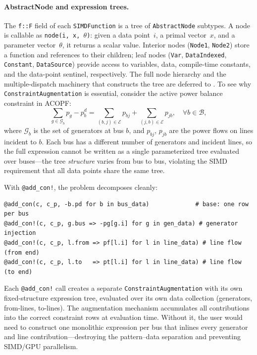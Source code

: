 \documentclass[11pt]{article}
\begin{document}
\paragraph{AbstractNode and expression trees.}
The \texttt{f::F} field of each \texttt{SIMDFunction} is a tree of \texttt{AbstractNode} subtypes. A node is callable as \texttt{node(i, x, $\theta$)}: given a data point~$i$, a primal vector~$x$, and a parameter vector~$\theta$, it returns a scalar value. Interior nodes (\texttt{Node1}, \texttt{Node2}) store a function and references to their children; leaf nodes (\texttt{Var}, \texttt{DataIndexed}, \texttt{Constant}, \texttt{DataSource}) provide access to variables, data, compile-time constants, and the data-point sentinel, respectively. The full node hierarchy and the multiple-dispatch machinery that constructs the tree are deferred to . To see why \texttt{ConstraintAugmentation} is essential, consider the active power balance constraint in ACOPF:
\begin{equation*}
  \sum_{g \in \mathcal{G}_b} p_g - p^d_b = \sum_{(b,j) \in \mathcal{E}} p_{bj}  + \sum_{(j,b) \in \mathcal{E}} p_{jb}, \quad \forall b \in \mathcal{B},
\end{equation*}
where $\mathcal{G}_b$ is the set of generators at bus $b$, and $p_{bj}$, $p_{jb}$ are the power flows on lines incident to $b$. Each bus has a different number of generators and incident lines, so the full expression cannot be written as a single parameterized tree evaluated over buses---the tree \emph{structure} varies from bus to bus, violating the SIMD requirement that all data points share the same tree.

With \texttt{@add\_con!}, the problem decomposes cleanly:
\begin{lstlisting}
@add_con(c, c_p, -b.pd for b in bus_data)             # base: one row per bus
@add_con!(c, c_p, g.bus => -pg[g.i] for g in gen_data) # generator injection
@add_con!(c, c_p, l.from => pf[l.i] for l in line_data) # line flow (from end)
@add_con!(c, c_p, l.to   => pt[l.i] for l in line_data) # line flow (to end)
\end{lstlisting}
Each \texttt{@add\_con!} call creates a separate \texttt{ConstraintAugmentation} with its own fixed-structure expression tree, evaluated over its own data collection (generators, from-lines, to-lines). The augmentation mechanism accumulates all contributions into the correct constraint rows at evaluation time. Without it, the user would need to construct one monolithic expression per bus that inlines every generator and line contribution---destroying the pattern--data separation and preventing SIMD/GPU parallelism.
\end{document}
